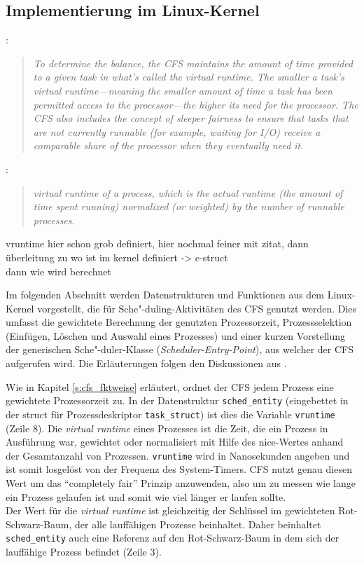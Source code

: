 \subsection{Implementierung im Linux-Kernel}\label{s:cstructs}
\cite{mjones}:
\begin{quote}
\textit{To determine the balance, the CFS maintains the amount of time provided to a given task in what's called the virtual runtime. The smaller a task's virtual runtime—meaning the smaller amount of time a task has been permitted access to the processor—the higher its need for the processor. The CFS also includes the concept of sleeper fairness to ensure that tasks that are not currently runnable (for example, waiting for I/O) receive a comparable share of the processor when they eventually need it. }
\end{quote}
\cite{rlove}:
\begin{quote}
\textit{virtual runtime of a process, which is the actual runtime
(the amount of time spent running) normalized (or weighted) by the number of runnable
processes.}
\end{quote}
vruntime hier schon grob definiert, hier nochmal feiner mit zitat, dann überleitung zu wo ist im kernel definiert -> c-struct \\
dann wie wird berechnet



Im folgenden Abschnitt werden Datenstrukturen und Funktionen aus dem Linux-Kernel vorgestellt, die für Sche"-duling-Aktivitäten des CFS genutzt werden. Dies umfasst die gewichtete Berechnung der genutzten Prozessorzeit, Prozessselektion (Einfügen, Löschen und Auswahl eines Prozesses) und einer kurzen Vorstellung der generischen Sche"-duler-Klasse (\textit{Scheduler-Entry-Point}), aus welcher der CFS aufgerufen wird. Die Erläuterungen folgen den Diskussionen aus \cite{rlove}.

Wie in Kapitel \ref{s:cfs_fktweise} erläutert, ordnet der CFS jedem Prozess eine gewichtete Prozessorzeit zu. In der Datenstruktur \texttt{sched\_entity} (eingebettet in der struct für Prozessdeskriptor \texttt{task\_struct}) ist dies die Variable \texttt{vruntime} (Zeile 8). Die \textit{virtual runtime} eines Prozesses ist die Zeit, die ein Prozess in Ausführung war, gewichtet oder normalisiert mit Hilfe des nice-Wertes anhand der Gesamtanzahl von Prozessen. \texttt{vruntime} wird in Nanosekunden angeben und ist somit losgelöst von der Frequenz des System-Timers. CFS nutzt genau diesen Wert um das ``completely fair'' Prinzip anzuwenden, also um zu messen wie lange ein Prozess gelaufen ist und somit wie viel länger er laufen sollte. \\
Der Wert für die \textit{virtual runtime} ist gleichzeitig der Schlüssel im gewichteten Rot-Schwarz-Baum, der alle lauffähigen Prozesse beinhaltet. Daher beinhaltet \texttt{sched\_entity} auch eine Referenz auf den Rot-Schwarz-Baum in dem sich der lauffähige Prozess befindet (Zeile 3).


